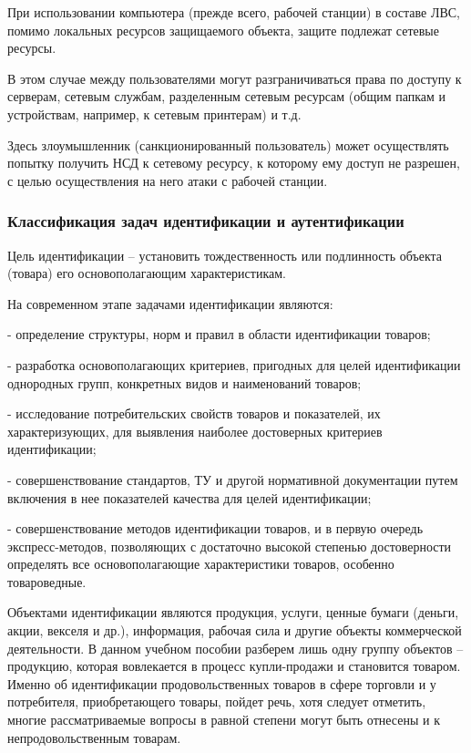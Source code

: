 \documentclass[a4paper,12pt]{extarticle}
\begin{document}
	При использовании компьютера (прежде всего, рабочей станции) в составе ЛВС, помимо локальных ресурсов защищаемого объекта, защите подлежат сетевые ресурсы.
	
	В этом случае между пользователями могут разграничиваться права по доступу к серверам, сетевым службам, разделенным сетевым ресурсам (общим папкам и устройствам, например, к сетевым принтерам) и т.д.
	
	Здесь злоумышленник (санкционированный пользователь) может осуществлять попытку получить НСД к сетевому ресурсу, к которому ему доступ не разрешен, с целью осуществления на него атаки с рабочей станции. 
	\subsubsection{Классификация задач идентификации и аутентификации}
	Цель идентификации – установить тождественность или подлинность объекта (товара) его основополагающим характеристикам.
	
	На современном этапе задачами идентификации являются:
	
	- определение структуры, норм и правил в области идентификации товаров;
	
	- разработка основополагающих критериев, пригодных для целей идентификации однородных групп, конкретных видов и наименований товаров;
	
	- исследование потребительских свойств товаров и показателей, их характеризующих, для выявления наиболее достоверных критериев идентификации;
	
	- совершенствование стандартов, ТУ и другой нормативной документации путем включения в нее показателей качества для целей идентификации;
	
	- совершенствование методов идентификации товаров, и в первую очередь экспресс-методов, позволяющих с достаточно высокой степенью достоверности определять все основополагающие характеристики товаров, особенно товароведные.
	
	Объектами идентификации являются продукция, услуги, ценные бумаги (деньги, акции, векселя и др.), информация, рабочая сила и другие объекты коммерческой деятельности. В данном учебном пособии разберем лишь одну группу объектов – продукцию, которая вовлекается в процесс купли-продажи и становится товаром. Именно об идентификации продовольственных товаров в сфере торговли и у потребителя, приобретающего товары, пойдет речь, хотя следует отметить, многие рассматриваемые вопросы в равной степени могут быть отнесены и к непродовольственным товарам.
	
\end{document}
